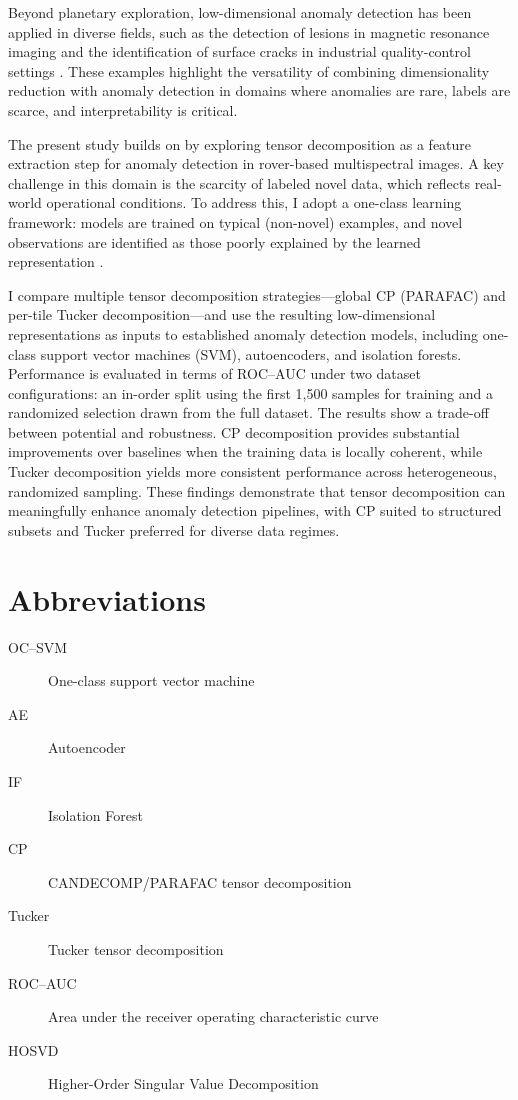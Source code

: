 \documentclass[11pt]{article}
\begin{document}
Beyond planetary exploration, low-dimensional anomaly detection has been applied in diverse fields, such as the detection of lesions in magnetic resonance imaging \citep{Kim2021} and the identification of surface cracks in industrial quality-control settings \citep{Tabernik2019}. These examples highlight the versatility of combining dimensionality reduction with anomaly detection in domains where anomalies are rare, labels are scarce, and interpretability is critical.

The present study builds on \citet{Kerner2020} by exploring tensor decomposition as a feature extraction step for anomaly detection in rover-based multispectral images. A key challenge in this domain is the scarcity of labeled novel data, which reflects real-world operational conditions. To address this, I adopt a one-class learning framework: models are trained on typical (non-novel) examples, and novel observations are identified as those poorly explained by the learned representation \citep{Pimentel2014}. 

I compare multiple tensor decomposition strategies—global CP (PARAFAC) and per-tile Tucker decomposition—and use the resulting low-dimensional representations as inputs to established anomaly detection models, including one-class support vector machines (SVM), autoencoders, and isolation forests. Performance is evaluated in terms of ROC–AUC under two dataset configurations: an in-order split using the first 1,500 samples for training and a randomized selection drawn from the full dataset. The results show a trade-off between potential and robustness. CP decomposition provides substantial improvements over baselines when the training data is locally coherent, while Tucker decomposition yields more consistent performance across heterogeneous, randomized sampling. These findings demonstrate that tensor decomposition can meaningfully enhance anomaly detection pipelines, with CP suited to structured subsets and Tucker preferred for diverse data regimes.

\section{Abbreviations}
\begin{description}
  \item[OC\mbox{--}SVM] One-class support vector machine
  \item[AE] Autoencoder
  \item[IF] Isolation Forest
  \item[CP] CANDECOMP/PARAFAC tensor decomposition
  \item[Tucker] Tucker tensor decomposition
  \item[ROC--AUC] Area under the receiver operating characteristic curve
  \item[HOSVD] Higher-Order Singular Value Decomposition
\end{description}
\end{document}
